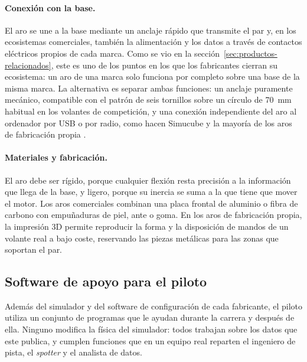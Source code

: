 \paragraph{Conexión con la base.}
El aro se une a la base mediante un anclaje rápido que transmite el par y, en los ecosistemas comerciales, también la alimentación y los datos a través de contactos eléctricos propios de cada marca. Como se vio en la sección~\ref{sec:productos-relacionados}, este es uno de los puntos en los que los fabricantes cierran su ecosistema: un aro de una marca solo funciona por completo sobre una base de la misma marca. La alternativa es separar ambas funciones: un anclaje puramente mecánico, compatible con el patrón de seis tornillos sobre un círculo de 70~mm habitual en los volantes de competición, y una conexión independiente del aro al ordenador por USB o por radio, como hacen Simucube y la mayoría de los aros de fabricación propia \parencite{simracingcockpit_qr, simucube_web}.

\paragraph{Materiales y fabricación.}
El aro debe ser rígido, porque cualquier flexión resta precisión a la información que llega de la base, y ligero, porque su inercia se suma a la que tiene que mover el motor. Los aros comerciales combinan una placa frontal de aluminio o fibra de carbono con empuñaduras de piel, ante o goma. En los aros de fabricación propia, la impresión 3D permite reproducir la forma y la disposición de mandos de un volante real a bajo coste, reservando las piezas metálicas para las zonas que soportan el par.

\subsection{Software de apoyo para el piloto}
\label{sec:software-apoyo}

Además del simulador y del software de configuración de cada fabricante, el piloto utiliza un conjunto de programas que le ayudan durante la carrera y después de ella. Ninguno modifica la física del simulador: todos trabajan sobre los datos que este publica, y cumplen funciones que en un equipo real reparten el ingeniero de pista, el \textit{spotter} y el analista de datos.

